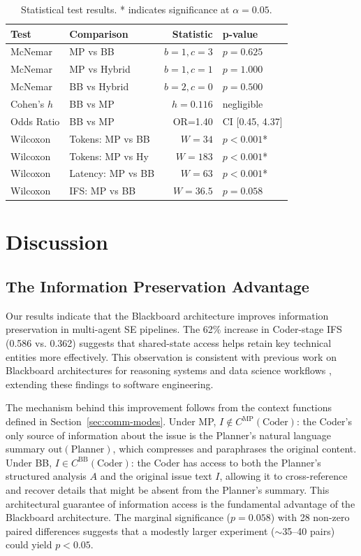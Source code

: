 \documentclass{ieeeaccess}
\begin{document}
\begin{table}[!ht]
\centering
\footnotesize
\caption{Statistical test results. * indicates significance at $\alpha=0.05$.}
\label{tab:statistics}
\begin{tabular}{@{}llrl@{}}
\toprule
\textbf{Test} & \textbf{Comparison} & \textbf{Statistic} & \textbf{p-value} \\
\midrule
McNemar & MP vs BB & $b=1, c=3$ & $p=0.625$ \\
McNemar & MP vs Hybrid & $b=1, c=1$ & $p=1.000$ \\
McNemar & BB vs Hybrid & $b=2, c=0$ & $p=0.500$ \\
Cohen's $h$ & BB vs MP & $h=0.116$ & negligible \\
Odds Ratio & BB vs MP & OR=1.40 & CI [0.45, 4.37] \\
Wilcoxon & Tokens: MP vs BB & $W=34$ & $p<0.001$* \\
Wilcoxon & Tokens: MP vs Hy & $W=183$ & $p<0.001$* \\
Wilcoxon & Latency: MP vs BB & $W=63$ & $p<0.001$* \\
Wilcoxon & IFS: MP vs BB & $W=36.5$ & $p=0.058$ \\
\bottomrule
\end{tabular}
\end{table}

\section{Discussion}

\subsection{The Information Preservation Advantage}

Our results indicate that the Blackboard architecture improves information preservation in multi-agent SE pipelines. The 62\% increase in Coder-stage IFS (0.586 vs. 0.362) suggests that shared-state access helps retain key technical entities more effectively. This observation is consistent with previous work on Blackboard architectures for reasoning systems \cite{wang2025lbmas} and data science workflows \cite{salemi2025llm}, extending these findings to software engineering.

The mechanism behind this improvement follows from the context functions defined in Section~\ref{sec:comm-modes}. Under MP, $I \notin C^{\text{MP}}(\text{Coder})$: the Coder's only source of information about the issue is the Planner's natural language summary $\text{out}(\text{Planner})$, which compresses and paraphrases the original content. Under BB, $I \in C^{\text{BB}}(\text{Coder})$: the Coder has access to both the Planner's structured analysis $A$ and the original issue text $I$, allowing it to cross-reference and recover details that might be absent from the Planner's summary. This architectural guarantee of information access is the fundamental advantage of the Blackboard architecture. The marginal significance ($p=0.058$) with 28 non-zero paired differences suggests that a modestly larger experiment ($\sim$35--40 pairs) could yield $p<0.05$.
\end{document}
